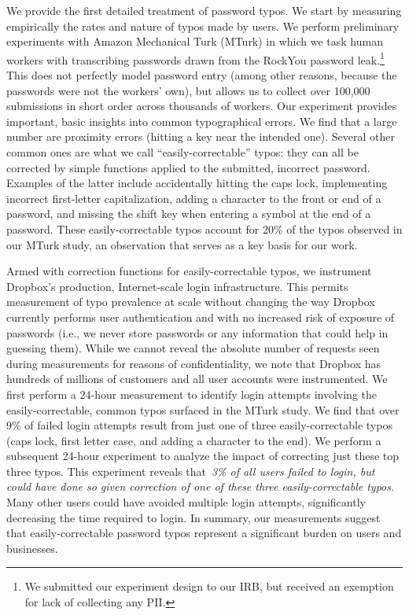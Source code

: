 We provide the first detailed treatment of password typos.  We start
by measuring empirically the rates and nature of typos made by users.
We perform preliminary experiments with Amazon Mechanical Turk (MTurk)
in which we task human workers with transcribing passwords drawn from
the RockYou password leak.\footnote{We submitted our experiment design
  to our IRB, but received an exemption for lack of collecting any
  PII.}  This does not perfectly model password entry (among other
reasons, because the passwords were not the workers' own), but allows
us to collect over 100,000 submissions in short order across thousands
of workers. Our experiment provides important, basic insights into
common typographical errors. We find that a large number are proximity
errors (hitting a key near the intended one). Several other common
ones are what we call ``easily-correctable'' typos: they can all
be corrected by simple functions applied to the submitted, incorrect
password. Examples of the latter include accidentally hitting the caps lock, implementing incorrect first-letter
capitalization, adding a character to the front or end of a password,
and missing the shift key when entering a symbol at the end of a
password. These easily-correctable typos account for 20\% of the typos
observed in our MTurk study, an observation that serves as a key basis
for our work.


Armed with correction functions for easily-correctable typos, we
instrument Dropbox's production, Internet-scale login infrastructure.
This permits measurement of typo prevalence at scale without
changing the way Dropbox currently performs user authentication and with no
increased risk of exposure of passwords (i.e., we never store passwords or 
any information that could help in guessing them).
While we cannot
reveal the absolute number of requests seen during measurements for reasons of
confidentiality, we note that Dropbox has hundreds of millions
of customers and all user accounts were instrumented.  We first
perform a 24-hour measurement to identify login attempts involving the
easily-correctable, common typos surfaced in the MTurk study.  We find
that over 9\% of failed login attempts result from just one of three
easily-correctable typos (caps lock, first letter case, and adding a
character to the end).  We perform a subsequent 24-hour experiment to
analyze the impact of correcting just these top three typos. This
experiment reveals that~{\em 3\% of all users failed to login, but
  could have done so given correction of one of these three
  easily-correctable typos}. Many other users %
could have avoided multiple login attempts, significantly
decreasing the time required to login. In summary, our measurements suggest that easily-correctable
password typos represent a significant burden on users and businesses.

